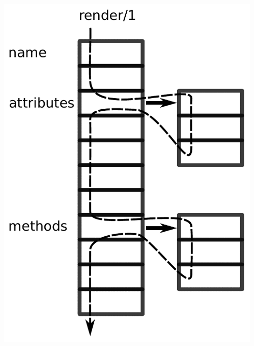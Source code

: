 \documentclass[10pt]{beamer}
\begin{document}
\begin{frame}[fragile]
\begin{columns}
\begin{column}{0.6\textwidth}
\end{column} \begin{column}{0.4\linewidth} \includegraphics[width=1\linewidth]{code_block_class.pdf} \end{column} \end{columns}

\end{frame}
\end{document}
